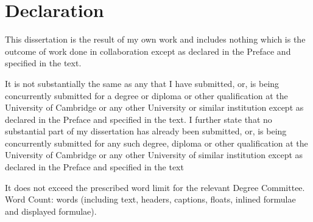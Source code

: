 \chapter*{Declaration}


This dissertation is the result of my own work and includes nothing which is the outcome of work done in collaboration except as declared in the Preface and specified in the text.

It is not substantially the same as any that I have submitted, or, is being concurrently submitted for a degree or diploma or other qualification at the University of Cambridge or any other University or similar institution except as declared in the Preface and specified in the text. I further state that no substantial part of my dissertation has already been submitted, or, is being concurrently submitted for any such degree, diploma or other qualification at the University of Cambridge or any other University of similar institution except as declared in the Preface and specified in the text


It does not exceed the prescribed word limit for the relevant Degree Committee.  
\ifdefined\lightweight{}
\else
Word Count: \wordcount{}words (including text, headers, captions, floats, inlined formulae and displayed formulae).
\fi


